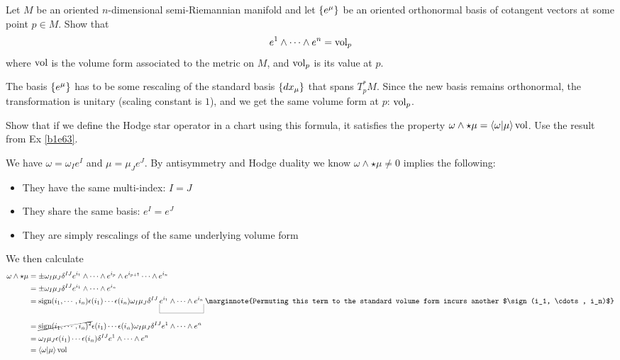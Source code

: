 \documentclass[10pt]{article}
\begin{document}
\begin{example}\label{b1e63}
	Let $M$ be an oriented $n$-dimensional semi-Riemannian manifold and let $\lbrace e^\mu\rbrace$ be an oriented orthonormal basis of cotangent vectors at some point $p \in M$. Show that
	$$
		e^1 \wedge \cdots \wedge e^n = \text{vol}_p
	$$
	where $\text{vol}$ is the volume form associated to the metric on $M$, and $\text{vol}_p$ is its value at $p$.
\end{example}
\sol The basis $\lbrace e^\mu\rbrace$ has to be some rescaling of the standard basis $\lbrace dx_\mu\rbrace$ that spans $T_p^*M$. Since the new basis remains orthonormal, the transformation is unitary (scaling constant is $1$), and we get the same volume form at $p$: $\text{vol}_p$.


\begin{example}
	Show that if we define the Hodge star operator in a chart using this formula, it satisfies the property $\omega \wedge \star\mu = \ip{\omega}{\mu} \vol$. Use the result from Ex \ref{b1e63}.
\end{example}
\sol We have $\omega = \omega_I e^I$ and $\mu = \mu_J e^J$. By antisymmetry and Hodge duality we know $\omega \wedge \star\mu \ne 0$ implies the following:
\begin{itemize}
	\item They have the same multi-index: $I = J$
	\item They share the same basis: $e^I = e^J$
	\item They are simply rescalings of the same underlying volume form
\end{itemize}  
We then calculate
$$
\begin{aligned}
	\omega \wedge \star\mu &= \pm \omega_I \mu_J \delta^{IJ} e^{i_1} \wedge \cdots \wedge e^{i_p} \wedge e^{i_{p+1}} \cdots \wedge e^{i_n}\\
	&= \pm \omega_I \mu_J \delta^{IJ} e^{i_1} \wedge \cdots \wedge e^{i_n}\\
	&= \sign(i_1, \cdots, i_n) \epsilon(i_1) \cdots \epsilon(i_n) \omega_I \mu_J \delta^{IJ} \ub{e^{i_1} \wedge \cdots \wedge e^{i_n}}{}\marginnote{Permuting this term to the standard volume form incurs another $\sign(i_1, \cdots, i_n)$}\\
	&= \cancel{\sign(i_1, \cdots, i_n)^2} \epsilon(i_1) \cdots \epsilon(i_n)\omega_I \mu_J \delta^{IJ} e^{1} \wedge \cdots \wedge e^{n}\\
	&= \omega_I \mu_J \epsilon(i_1) \cdots \epsilon(i_n) \delta^{IJ} e^{1} \wedge \cdots \wedge e^{n}\\
	&= \ip{\omega}{\mu} \vol
\end{aligned}
$$
\end{document}
